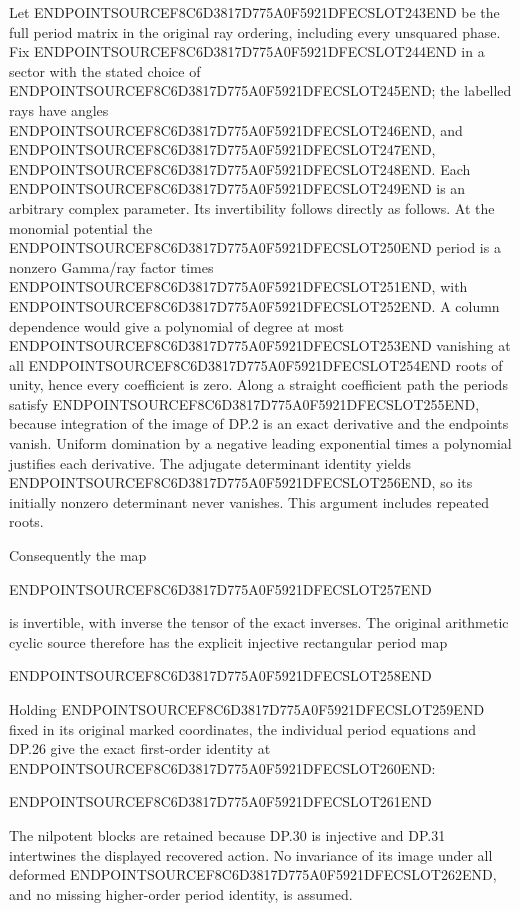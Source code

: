 Let ENDPOINTSOURCEF8C6D3817D775A0F5921DFECSLOT243END be the full period matrix in the original ray ordering, including every unsquared phase. Fix ENDPOINTSOURCEF8C6D3817D775A0F5921DFECSLOT244END in a sector with the stated choice of ENDPOINTSOURCEF8C6D3817D775A0F5921DFECSLOT245END; the labelled rays have angles ENDPOINTSOURCEF8C6D3817D775A0F5921DFECSLOT246END, and ENDPOINTSOURCEF8C6D3817D775A0F5921DFECSLOT247END, ENDPOINTSOURCEF8C6D3817D775A0F5921DFECSLOT248END. Each ENDPOINTSOURCEF8C6D3817D775A0F5921DFECSLOT249END is an arbitrary complex parameter. Its invertibility follows directly as follows. At the monomial potential the ENDPOINTSOURCEF8C6D3817D775A0F5921DFECSLOT250END period is a nonzero Gamma/ray factor times ENDPOINTSOURCEF8C6D3817D775A0F5921DFECSLOT251END, with ENDPOINTSOURCEF8C6D3817D775A0F5921DFECSLOT252END. A column dependence would give a polynomial of degree at most ENDPOINTSOURCEF8C6D3817D775A0F5921DFECSLOT253END vanishing at all ENDPOINTSOURCEF8C6D3817D775A0F5921DFECSLOT254END roots of unity, hence every coefficient is zero. Along a straight coefficient path the periods satisfy ENDPOINTSOURCEF8C6D3817D775A0F5921DFECSLOT255END, because integration of the image of DP.2 is an exact derivative and the endpoints vanish. Uniform domination by a negative leading exponential times a polynomial justifies each derivative. The adjugate determinant identity yields ENDPOINTSOURCEF8C6D3817D775A0F5921DFECSLOT256END, so its initially nonzero determinant never vanishes. This argument includes repeated roots.

Consequently the map

ENDPOINTSOURCEF8C6D3817D775A0F5921DFECSLOT257END

is invertible, with inverse the tensor of the exact inverses. The original arithmetic cyclic source therefore has the explicit injective rectangular period map

ENDPOINTSOURCEF8C6D3817D775A0F5921DFECSLOT258END

Holding ENDPOINTSOURCEF8C6D3817D775A0F5921DFECSLOT259END fixed in its original marked coordinates, the individual period equations and DP.26 give the exact first-order identity at ENDPOINTSOURCEF8C6D3817D775A0F5921DFECSLOT260END:

ENDPOINTSOURCEF8C6D3817D775A0F5921DFECSLOT261END

The nilpotent blocks are retained because DP.30 is injective and DP.31 intertwines the displayed recovered action. No invariance of its image under all deformed ENDPOINTSOURCEF8C6D3817D775A0F5921DFECSLOT262END, and no missing higher-order period identity, is assumed.

